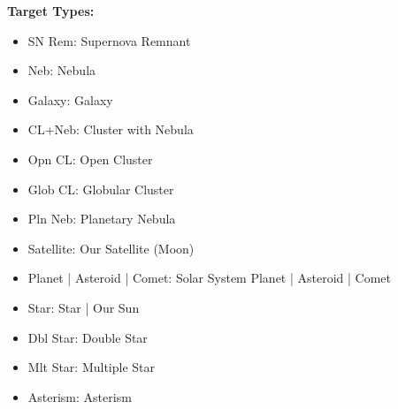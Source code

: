 \bigskip
{\bf Target Types:}
\begin{itemize}
\renewcommand\labelitemi{--}
\item SN Rem: Supernova Remnant
\item Neb: Nebula
\item Galaxy: Galaxy
\item CL+Neb: Cluster with Nebula
\item Opn CL: Open Cluster
\item Glob CL: Globular Cluster
\item Pln Neb: Planetary Nebula
\item Satellite: Our Satellite (Moon)
\item Planet | Asteroid | Comet: Solar System Planet | Asteroid | Comet
\item Star: Star | Our Sun
\item Dbl Star: Double Star
\item Mlt Star: Multiple Star
\item Asterism: Asterism
\end{itemize}



